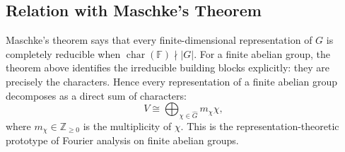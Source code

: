 \documentclass[12pt,a4paper]{ctexart}
\theoremstyle{remark}
\begin{document}
\subsection*{Relation with Maschke's Theorem}

Maschke's theorem says that every finite-dimensional representation of \(G\) is
completely reducible when \(\operatorname{char}(\mathbb{F})\nmid |G|\). For a
finite abelian group, the theorem above identifies the irreducible building
blocks explicitly: they are precisely the characters. Hence every
representation of a finite abelian group decomposes as a direct sum of
characters:
\[
  V\cong \bigoplus_{\chi\in\widehat{G}} m_{\chi}\chi,
\]
where \(m_{\chi}\in \mathbb{Z}_{\ge 0}\) is the multiplicity of \(\chi\). This
is the representation-theoretic prototype of Fourier analysis on finite
abelian groups.
\end{document}
